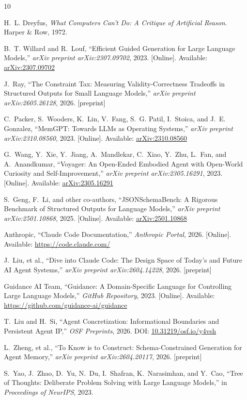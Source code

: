\documentclass[10pt,journal,compsoc]{IEEEtran}
\begin{document}
\begin{thebibliography}{10}

H.~L. Dreyfus, {\em What Computers Can't Do: A Critique of Artificial Reason}. Harper \& Row, 1972.

B.~T. Willard and R.~Louf, ``Efficient Guided Generation for Large Language Models,'' {\em arXiv preprint arXiv:2307.09702}, 2023. [Online]. Available: \href{https://arxiv.org/abs/2307.09702}{arXiv:2307.09702}

J.~Ray, ``The Constraint Tax: Measuring Validity-Correctness Tradeoffs in Structured Outputs for Small Language Models,'' {\em arXiv preprint arXiv:2605.26128}, 2026. [preprint]

C.~Packer, S.~Wooders, K.~Lin, V.~Fang, S.~G. Patil, I.~Stoica, and J.~E. Gonzalez, ``MemGPT: Towards LLMs as Operating Systems,'' {\em arXiv preprint arXiv:2310.08560}, 2023. [Online]. Available: \href{https://arxiv.org/abs/2310.08560}{arXiv:2310.08560}

G.~Wang, Y.~Xie, Y.~Jiang, A.~Mandlekar, C.~Xiao, Y.~Zhu, L.~Fan, and A.~Anandkumar, ``Voyager: An Open-Ended Embodied Agent with Open-World Curiosity and Self-Improvement,'' {\em arXiv preprint arXiv:2305.16291}, 2023. [Online]. Available: \href{https://arxiv.org/abs/2305.16291}{arXiv:2305.16291}

S.~Geng, F.~Li, and other co-authors, ``JSONSchemaBench: A Rigorous Benchmark of Structured Outputs for Language Models,'' {\em arXiv preprint arXiv:2501.10868}, 2025. [Online]. Available: \href{https://arxiv.org/abs/2501.10868}{arXiv:2501.10868}

Anthropic, ``Claude Code Documentation,'' {\em Anthropic Portal}, 2026. [Online]. Available: \href{https://code.claude.com/}{https://code.claude.com/}

J.~Liu, et al., ``Dive into Claude Code: The Design Space of Today's and Future AI Agent Systems,'' {\em arXiv preprint arXiv:2604.14228}, 2026. [preprint]

Guidance AI Team, ``Guidance: A Domain-Specific Language for Controlling Large Language Models,'' {\em GitHub Repository}, 2023. [Online]. Available: \href{https://github.com/guidance-ai/guidance}{https://github.com/guidance-ai/guidance}

T.~Liu and H.~Si, ``Agent Concretization: Informational Boundaries and Persistent Agent IP,'' {\em OSF Preprints}, 2026. DOI: \href{https://doi.org/10.31219/osf.io/y4vsh}{10.31219/osf.io/y4vsh}

L.~Zheng, et al., ``To Know is to Construct: Schema-Constrained Generation for Agent Memory,'' {\em arXiv preprint arXiv:2604.20117}, 2026. [preprint]

S.~Yao, J.~Zhao, D.~Yu, N.~Du, I.~Shafran, K.~Narasimhan, and Y.~Cao, ``Tree of Thoughts: Deliberate Problem Solving with Large Language Models,'' in {\em Proceedings of NeurIPS}, 2023.

\end{thebibliography}
\end{document}
